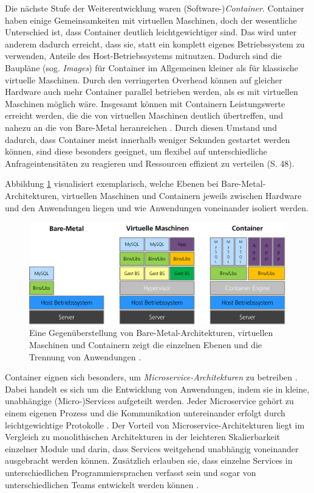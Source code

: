 \documentclass[11pt,a4paper]{article}
\begin{document}
Die nächste Stufe der Weiterentwicklung waren (Software-)\emph{Container}.
Container haben einige Gemeinsamkeiten mit virtuellen Maschinen, doch der wesentliche Unterschied ist,
dass Container deutlich leichtgewichtiger sind. Das wird unter anderem dadurch erreicht, dass sie,
statt ein komplett eigenes Betriebssystem zu verwenden,
Anteile des Host-Betriebssystems mitnutzen. Dadurch sind die Baupläne (sog. \emph{Images})
für Container im Allgemeinen kleiner als für klassische virtuelle Maschinen.
Durch den verringerten Overhead können auf gleicher Hardware auch mehr Container parallel betrieben werden,
als es mit virtuellen Maschinen möglich wäre.
Insgesamt können mit Containern Leistungswerte erreicht werden, die die von virtuellen Maschinen deutlich übertreffen,
und nahezu an die von Bare-Metal heranreichen \cite{1272998.1273025}.
Durch diesen Umstand und dadurch, dass Container meist innerhalb weniger Sekunden gestartet werden können, sind diese besonders geeignet,
um flexibel auf unterschiedliche Anfrageintensitäten zu reagieren und Ressourcen effizient zu verteilen \cite{kofler2021docker} (S. 48).

Abbildung \ref{fig:arch-vergleich} visualisiert exemplarisch, welche Ebenen bei Bare-Metal-Architekturen, virtuellen Maschinen und Containern
jeweils zwischen Hardware und den Anwendungen liegen und wie Anwendungen voneinander isoliert werden.

\begin{figure}[h]
  \centering
  \includegraphics[width=1\textwidth]{./media/7899247 (eigen).png}
  \caption{Eine Gegenüberstellung von Bare-Metal-Architekturen, virtuellen Maschinen und Containern zeigt die einzelnen Ebenen und die Trennung von Anwendungen \cite{7899247}.}
  \label{fig:arch-vergleich}
\end{figure}

Container eignen sich besonders, um \emph{Microservice-Architekturen} zu betreiben \cite{7158965}. Dabei handelt es sich um die
Entwicklung von Anwendungen, indem sie in kleine, unabhängige (Micro-)Services aufgeteilt werden. Jeder Microservice gehört zu
einem eigenen Prozess und die Kommunikation untereinander erfolgt durch leichtgewichtige Protokolle \cite{8406008}.
Der Vorteil von Microservice-Architekturen liegt im Vergleich zu monolithischen Architekturen in der
leichteren Skalierbarkeit einzelner Module und darin, dass Services weitgehend unabhängig voneinander
ausgebracht werden können. Zusätzlich erlauben sie, dass einzelne Services in unterschiedlichen Programmiersprachen
verfasst sein und sogar von unterschiedlichen Teams entwickelt werden können \cite{microservices}.
\end{document}
